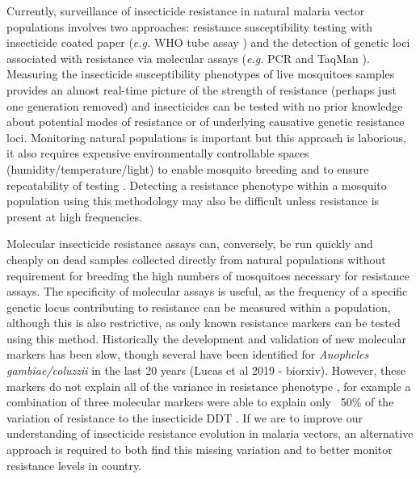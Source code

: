 \documentclass[a4paper,11pt,abstracton,hidelinks]{scrartcl}
\begin{document}
Currently, surveillance of insecticide resistance in natural malaria vector populations involves two approaches:
%
resistance susceptibility testing with insecticide coated paper (\textit{e.g.} WHO tube assay \cite{world2016test}) and the detection of genetic loci associated with resistance via molecular assays (\textit{e.g.} PCR \cite{Ranson2000} and TaqMan \cite{bass2007}).
%
Measuring the insecticide susceptibility phenotypes of live mosquitoes samples provides an almost real-time picture of the strength of resistance (perhaps just one generation removed) and insecticides can be tested with no prior knowledge about potential modes of resistance or of underlying causative genetic resistance loci.
%
Monitoring natural populations is important but this approach is laborious, it also requires expensive environmentally controllable spaces (humidity/temperature/light) to enable mosquito breeding and to ensure repeatability of testing \cite{kleinschmidt2018}.
%
Detecting a resistance phenotype within a mosquito population using this methodology may also be difficult unless resistance is present at high frequencies.


Molecular insecticide resistance assays can, conversely, be run quickly and cheaply on dead samples collected directly from natural populations without requirement for breeding the high numbers of mosquitoes necessary for resistance assays.
%
The specificity of molecular assays is useful, as the frequency of a specific genetic locus contributing to resistance can be measured within a population, although this is also restrictive, as only known resistance markers can be tested using this method.
%
Historically the development and validation of new molecular markers has been slow, though several have been identified for \textit{Anopheles gambiae/coluzzii} in the last 20 years \cite{du2005, jones2012, martinez1998, mitchell2014, ranson2000, riveron2014, weetman2018, weill2003} (Lucas et al 2019 - biorxiv).
%
However, these markers do not explain all of the variance in resistance phenotype \cite{donnelly2009, donnelly2016}, for example a combination of three molecular markers were able to explain only ~50\% of the variation of resistance to the insecticide DDT \cite{mitchell2014}.
%
If we are to improve our understanding of insecticide resistance evolution in malaria vectors, an alternative approach is required to both find this missing variation and to better monitor resistance levels in country. 
\end{document}
